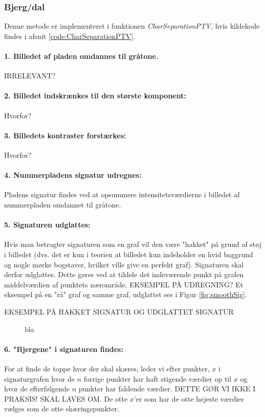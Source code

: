 \subsubsection*{Bjerg/dal}

Denne metode er implementeret i funktionen \textit{CharSeparationPTV}, hvis kildekode findes i afsnit \vref{code:CharSeparationPTV}.

\paragraph{1. Billedet af pladen omdannes til gråtone.} IRRELEVANT?

\paragraph{2. Billedet indskrænkes til den største komponent:}
Hvorfor?

\paragraph{3. Billedets kontraster forstærkes:}
Hvorfor?

\paragraph{4. Nummerpladens signatur udregnes:}
Pladens signatur findes ved at opsummere intensitetsværdierne i billedet af nummerpladen omdannet til gråtone.

\paragraph{5. Signaturen udglattes:}
Hvis man betragter signaturen som en graf vil den være "hakket" på grund af støj i billedet (dvs. det er kun i teorien at billedet kun indeholder en hvid baggrund og nogle mørke bogstaver, hvilket ville give en perfekt graf). Signaturen skal derfor udglattes. Dette gøres ved at tildele det indeværende punkt på grafen middelværdien af punktets nærområde. EKSEMPEL PÅ UDREGNING? Et eksempel på en "rå" graf og samme graf, udglattet ses i Figur \vref{fig:smoothSig}.

EKSEMPEL PÅ HAKKET SIGNATUR OG UDGLATTET SIGNATUR

\begin{figure}[htp]
\label{fig:smoothSig}
\caption{bla}
\end{figure}

\paragraph{6. "Bjergene" i signaturen findes:}
For at finde de toppe hvor der skal skæres, leder vi efter punkter, $x$ i signaturgrafen hvor de $n$ forrige punkter har haft stigende værdier op til $x$ og hvor de efterfølgende $n$ punkter har faldende værdier. DETTE GØR VI IKKE I PRAKSIS! SKAL LAVES OM. De otte $x$'er som har de otte højeste værdier vælges som de otte skæringspunkter.

